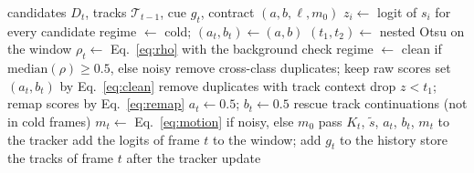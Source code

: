 \begin{algorithm}[t]
\caption{\scl{} for frame $t$}\label{alg:layer}
\begin{algorithmic}[1]
\Require candidates $D_t$, tracks $\mathcal{T}_{t-1}$, cue $g_t$, contract $(a,b,\ell,m_0)$
\State $z_i\gets$ logit of $s_i$ for every candidate
  \State regime $\gets$ cold; $(a_t,b_t)\gets(a,b)$
\Else
  \State $(t_1,t_2)\gets$ nested Otsu on the window
  \State $\rho_t\gets$ Eq.~\eqref{eq:rho} with the background check
  \State regime $\gets$ clean if $\mathrm{median}(\rho)\ge0.5$, else noisy
\EndIf
{}
  \State remove cross-class duplicates; keep raw scores
   set $(a_t,b_t)$ by Eq.~\eqref{eq:clean}
  \EndIf
\Else
  \State remove duplicates with track context
  \State drop $z<t_1$; remap scores by Eq.~\eqref{eq:remap}
  \State $a_t\gets0.5$; $b_t\gets0.5$
\EndIf
\State rescue track continuations (not in cold frames)
\State $m_t\gets$ Eq.~\eqref{eq:motion} if noisy, else $m_0$
\State pass $K_t$, $\tilde{s}$, $a_t$, $b_t$, $m_t$ to the tracker
\State add the logits of frame $t$ to the window; add $g_t$ to the history
\State store the tracks of frame $t$ after the tracker update
\end{algorithmic}
\end{algorithm}
